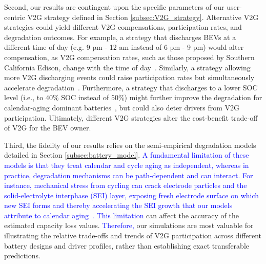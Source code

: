 \documentclass[pdflatex,sn-nature]{sn-jnl}%
\theoremstyle{thmstyleone}%
\theoremstyle{thmstyletwo}%
\theoremstyle{thmstylethree}%
\begin{document}
Second, our results are contingent upon the specific parameters of our user-centric V2G strategy defined in Section \ref{subsec:V2G_strategy}. Alternative V2G strategies could yield different V2G compensations, participation rates, and degradation outcomes. For example, a strategy that discharges BEVs at a different time of day (e.g. 9 pm - 12 am instead of 6 pm - 9 pm) would alter compensation, as V2G compensation rates, such as those proposed by Southern California Edison, change with the time of day~\cite{SCE_V2G_pilot_program}. Similarly, a strategy allowing more V2G discharging events could raise participation rates but simultaneously accelerate degradation~\cite{Dubarry2017, Hamid_V2G}. Furthermore, a strategy that discharges to a lower SOC level (i.e., to $40\%$ SOC instead of $50\%$) might further improve the degradation for calendar-aging dominant batteries~\cite{Wei2022}, but could also deter drivers from V2G participation. Ultimately, different V2G strategies alter the cost-benefit trade-off of V2G for the BEV owner.



Third, the fidelity of our results relies on the semi-empirical degradation models detailed in Section \ref{subsec:battery_model}. \textcolor{blue}{A fundamental limitation of these models is that they treat calendar and cycle aging as independent, whereas in practice, degradation mechanisms can be path-dependent and can interact. For instance, mechanical stress from cycling can crack electrode particles and the solid-electrolyte interphase (SEI) layer, exposing fresh electrode surface on which new SEI forms and thereby accelerating the SEI growth that our models attribute to calendar aging~\cite{Smith2021}.} \textcolor{blue}{This limitation} can affect the accuracy of the estimated capacity loss values. \textcolor{blue}{Therefore,} our simulations are most valuable for illustrating the relative trade-offs and trends of V2G participation across different battery designs and driver profiles, rather than establishing exact transferable predictions.
\end{document}
